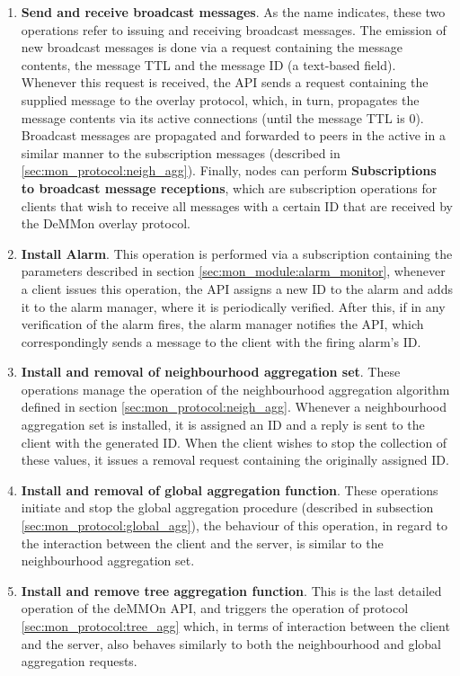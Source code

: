 \begin{enumerate}
    \item \textbf{Send and receive broadcast messages}. As the name indicates, these two operations refer to issuing and receiving broadcast messages. The emission of new broadcast messages is done via a request containing the message contents, the message TTL and the message ID (a text-based field). Whenever this request is received, the API sends a request containing the supplied message to the overlay protocol, which, in turn, propagates the message contents via its active connections (until the message TTL is 0). Broadcast messages are propagated and forwarded to peers in the active in a similar manner to the subscription messages (described in \ref{sec:mon_protocol:neigh_agg}). Finally, nodes can perform \textbf{Subscriptions to broadcast message receptions}, which are subscription operations for clients that wish to receive all messages with a certain ID that are received by the DeMMon overlay protocol. 
    
    \item \textbf{Install Alarm}. This operation is performed via a subscription containing the parameters described in section \ref{sec:mon_module:alarm_monitor}, whenever a client issues this operation, the API assigns a new ID to the alarm and adds it to the alarm manager, where it is periodically verified. After this, if in any verification of the alarm fires, the alarm manager notifies the API, which correspondingly sends a message to the client with the firing alarm's ID.

    \item \textbf{Install and removal of neighbourhood aggregation set}. These operations manage the operation of the neighbourhood aggregation algorithm defined in section \ref{sec:mon_protocol:neigh_agg}. Whenever a neighbourhood aggregation set is installed, it is assigned an ID and a reply is sent to the client with the generated ID. When the client wishes to stop the collection of these values, it issues a removal request containing the originally assigned ID.

    \item \textbf{Install and removal of global aggregation function}. These operations initiate and stop the global aggregation procedure (described in subsection \ref{sec:mon_protocol:global_agg}), the behaviour of this operation, in regard to the interaction between the client and the server, is similar to the neighbourhood aggregation set. 
    
    \item \textbf{Install and remove tree aggregation function}. This is the last detailed operation of the deMMOn API, and triggers the operation of protocol \ref{sec:mon_protocol:tree_agg} which, in terms of interaction between the client and the server, also behaves similarly to both the neighbourhood and global aggregation requests.
    
\end{enumerate}

